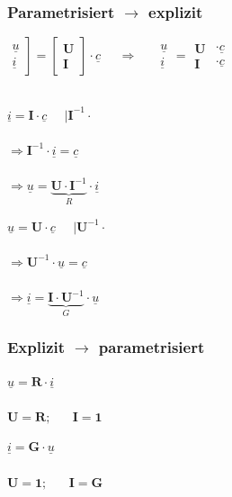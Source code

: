 \documentclass[a4paper,twocolumn,10pt]{article}
\begin{document}
\subsubsection*{Parametrisiert $\rightarrow$ explizit}
$\left.\begin{matrix}\underline{u}\\\underline{i}\end{matrix}\right]=\begin{bmatrix}\textbf{U} \\ \textbf{I}\end{bmatrix}\cdot \underline{c}\;\;\;\;\;\Rightarrow\;\;\;\;\; \begin{matrix}\underline{u}\\\underline{i}\end{matrix}=\begin{matrix}\textbf{U}\\ \textbf{I}\end{matrix} \begin{matrix}\cdot\underline{c}\\ \cdot\underline{c}\end{matrix}$\\\\
\begin{minipage}[b]{0.23\textwidth}
$\underline{i}=\textbf{I}\cdot \underline{c}\;\;\;\;\;|\textbf{I}^{-1}\cdot$\\\\
$\Rightarrow \textbf{I}^{-1}\cdot \underline{i}=\underline{c}$\\\\
$\Rightarrow \underline{u}=\underbrace{\textbf{U}\cdot \textbf{I}^{-1}}_{R}\cdot \underline{i}$
\end{minipage}
\hfill
\begin{minipage}[b]{0.23\textwidth}
$\underline{u}=\textbf{U}\cdot \underline{c}\;\;\;\;\;|\textbf{U}^{-1}\cdot$\\\\
$\Rightarrow \textbf{U}^{-1}\cdot \underline{u}=\underline{c}$\\\\
$\Rightarrow \underline{i}=\underbrace{\textbf{I}\cdot \textbf{U}^{-1}}_{G}\cdot \underline{u}$
\end{minipage}

\subsubsection*{Explizit $\rightarrow$ parametrisiert}
\begin{minipage}[b]{0.23\textwidth}
$\underline{u}=\textbf{R}\cdot \underline{i}$\\\\
$\textbf{U}=\textbf{R};\;\;\;\;\;\;\textbf{I}=\textbf{1}$
\end{minipage}
\hfill
\begin{minipage}[b]{0.23\textwidth}
$\underline{i}=\textbf{G}\cdot \underline{u}$\\\\
$\textbf{U}=\textbf{1};\;\;\;\;\;\;\textbf{I}=\textbf{G}$
\end{minipage}
\end{document}
